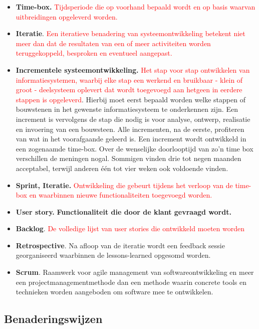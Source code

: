 \begin{itemize}
    \item \textbf{Time-box.}
\textcolor{red}{Tijdsperiode die op voorhand bepaald wordt en op basis waarvan uitbreidingen opgeleverd worden.}
    \item \textbf{Iteratie}.
\textcolor{red}{Een iteratieve benadering van systeemontwikkeling betekent niet meer dan dat de resultaten van een of meer activiteiten worden teruggekoppeld, besproken en eventueel aangepast.}
    \item \textbf{Incrementele systeemontwikkeling.}
\textcolor{red}{Het stap voor stap ontwikkelen van informatiesystemen, waarbij elke stap een werkend en bruikbaar - klein of groot - deelsysteem oplevert dat wordt toegevoegd aan hetgeen in eerdere stappen is opgeleverd}. Hierbij moet eerst bepaald worden welke stappen of bouwstenen in het gewenste informatiesysteem te onderkennen zijn. Een increment is vervolgens de stap die nodig is voor analyse, ontwerp, realisatie en invoering van een bouwsteen. Alle incrementen, na de eerste, profiteren van wat in het voorafgaande geleerd is. Een increment wordt ontwikkeld in een zogenaamde time-box. Over de wenselijke doorlooptijd van zo'n time box verschillen de meningen nogal. Sommigen vinden drie tot negen maanden acceptabel, terwijl anderen één tot vier weken ook voldoende vinden.
    \item \textbf{Sprint, Iteratie.}
\textcolor{red}{Ontwikkeling die gebeurt tijdens het verloop van de time-box en waarbinnen nieuwe functionaliteiten toegevoegd worden.}
    \item \textbf{User story.}
\textbf{Functionaliteit die door de klant gevraagd wordt.}
    \item \textbf{Backlog}.
\textcolor{red}{De volledige lijst van user stories die ontwikkeld moeten worden}
    \item \textbf{Retrospective}.
Na afloop van de iteratie wordt een feedback sessie georganiseerd waarbinnen de lessons-learned opgesomd worden.
\item \textbf{Scrum}.
Raamwerk voor agile management van softwareontwikkeling en meer een projectmanagementmethode dan een methode waarin concrete tools en technieken worden aangeboden om software mee te ontwikkelen.
\end{itemize}

\newpage
\subsection{Benaderingswijzen}

